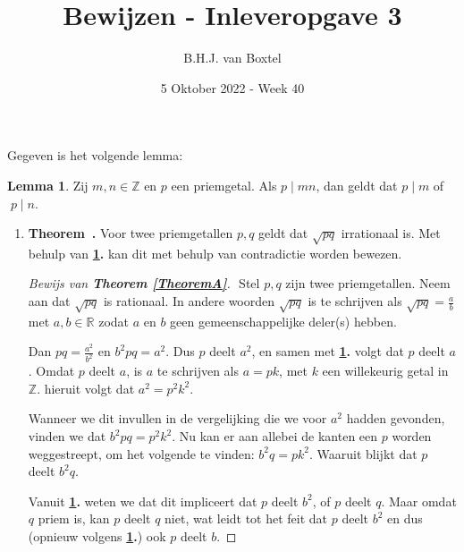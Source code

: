 \documentclass[12pt, dutch, a4paper]{article}
\theoremstyle{definition}
\newtheorem{lemmalos}{Lemma}
\newenvironment{shortthm}
  {\refstepcounter{theorem}\textbf{Theorem~\thetheorem.}}%
{\enskip}
\begin{document}
\title{Bewijzen - Inleveropgave 3}
\author{B.H.J. van Boxtel}
\date{5 Oktober 2022 - Week 40} 

\maketitle
{} 

Gegeven is het volgende lemma:
\begin{lemmalos}\label{lemma1}
    Zij $m,n \in \mathbb{Z}$ en $p$ een priemgetal. Als $p \mid mn$, 
    dan geldt dat $p \mid m$ of $\; p \mid n$.
\end{lemmalos}

\begin{enumerate}[(a.)]
    \item
    \begin{shortthm}\label{TheoremA}
        Voor twee priemgetallen $p,q$ geldt dat $\sqrt{pq}$ irrationaal is.
    \end{shortthm}
    Met behulp van \textbf{\cref{lemma1}.} kan dit met behulp van contradictie worden bewezen.
    \begin{proof}[Bewijs van \textbf{Theorem \ref{TheoremA}}] $ $ \newline
        Stel $p,q$ zijn twee priemgetallen. \newline
        Neem aan dat $\sqrt{pq}$ is rationaal.
        In andere woorden $\sqrt{pq}$ is te schrijven als $\sqrt{pq} = \tfrac{a}{b}$ 
        met $a,b \in \mathbb{R}$ zodat $a$ en $b$ geen gemeenschappelijke deler(s) hebben.

        Dan $pq = \tfrac{a^2}{b^2}$ en $b^2pq = a^2$. \newline
        Dus $p$ deelt $a^2$, 
        en samen met \textbf{\cref{lemma1}.} volgt dat $p$ deelt $a$. \newline 
        Omdat $p$ deelt $a$, is $a$ te schrijven als 
        $a = pk$, met $k$ een willekeurig getal in $\mathbb{Z}$.
        hieruit volgt dat $a^2 = p^2k^2$.

        Wanneer we dit invullen in de vergelijking die we voor $a^2$ hadden gevonden, 
        vinden we dat $b^2pq = p^2k^2$. 
        Nu kan er aan allebei de kanten een $p$ worden weggestreept, 
        om het volgende te vinden: $b^2q = pk^2$. Waaruit blijkt dat $p$ deelt $b^2q$.

        Vanuit \textbf{\cref{lemma1}.} weten we dat dit impliceert dat $p$ deelt $b^2$, 
        of $p$ deelt $q$. Maar omdat $q$ priem is, kan $p$ deelt $q$ niet,
        wat leidt tot het feit dat $p$ deelt $b^2$ 
        en dus (opnieuw volgens \textbf{\cref{lemma1}.}) ook $p$ deelt $b$.


\end{proof}
\end{enumerate}
\end{document}
